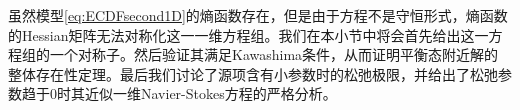 % 

虽然模型\eqref{eq:ECDFsecond1D}的熵函数存在，但是由于方程不是守恒形式，熵函数的Hessian矩阵无法对称化这一一维方程组。我们在本小节中将会首先给出这一方程组的一个对称子。然后验证其满足Kawashima条件，从而证明平衡态附近解的整体存在性定理。最后我们讨论了源项含有小参数时的松弛极限，并给出了松弛参数趋于0时其近似一维Navier-Stokes方程的严格分析。

